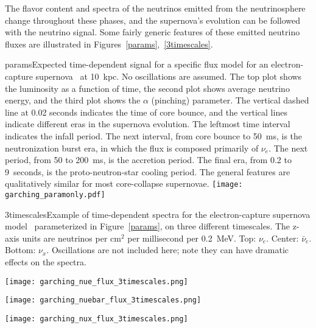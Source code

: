 The flavor content and spectra of the neutrinos emitted from the neutrinosphere change
throughout these phases, and the supernova's evolution can
be followed with the neutrino signal. 
Some fairly generic features of these emitted neutrino fluxes are
illustrated in Figures~\ref{params},~\ref{3timescales}.


\begin{dunefigure}{params}{Expected
  time-dependent signal for a specific flux model for an
  electron-capture supernova~\cite{Huedepohl:2009wh} at 10~kpc.  No oscillations are assumed. The
  top plot shows the luminosity as a function of time, the second plot
  shows average neutrino energy, and the third plot shows the $\alpha$
  (pinching) parameter.  The vertical dashed line at 0.02 seconds indicates
  the time of core bounce, and the vertical lines indicate different
  eras in the supernova evolution.  The leftmost time interval
  indicates the infall period.  The next interval, from core bounce to
  50~ms, is the neutronization burst era, in which the flux is
  composed primarily of $\nu_e$.  The next period, from 50 to 200~ms,
  is the accretion period. The final era, from 0.2 to 9~seconds, is
  the proto-neutron-star cooling period.  The general features are
  qualitatively similar for most core-collapse supernovae.}
\texttt{[image: garching\_paramonly.pdf]}
\end{dunefigure}

\begin{dunefigure}{3timescales}{Example of time-dependent spectra for the electron-capture supernova model~\cite{Huedepohl:2009wh} parameterized in Figure~\ref{params}, on three different timescales.   The z-axis units are neutrinos per cm$^2$ per millisecond per 0.2~MeV.  Top: $\nu_e$.  Center: $\bar{\nu}_e$.  Bottom: $\nu_x$.  Oscillations are not included here; note they can have dramatic effects on the spectra.}
\centerline{\texttt{[image: garching\_nue\_flux\_3timescales.png]}}
\centerline{\texttt{[image: garching\_nuebar\_flux\_3timescales.png]}}
\centerline{\texttt{[image: garching\_nux\_flux\_3timescales.png]}}
\end{dunefigure}




